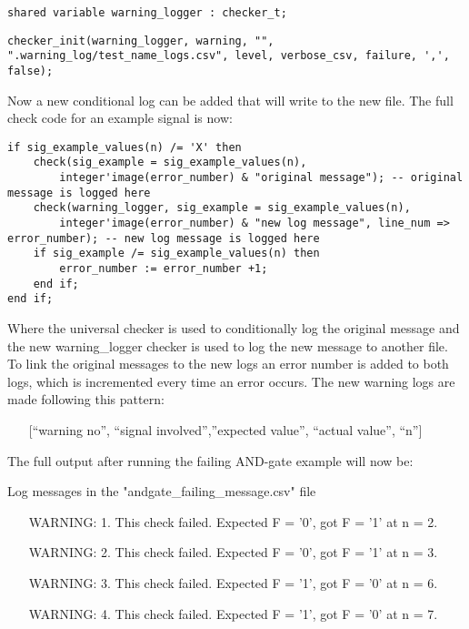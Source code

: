 \begin{lstlisting}[style=vhdl, caption={Custom checker declaration}, label={vhdl:new_checker_declaration}]
shared variable warning_logger : checker_t;
\end{lstlisting}\noindent
\begin{lstlisting}[style=vhdl, caption={Custom checker initialisation}, label={vhdl:new_checker_init}]
checker_init(warning_logger, warning, "", ".warning_log/test_name_logs.csv", level, verbose_csv, failure, ',', false);
\end{lstlisting}\noindent
Now a new conditional log can be added that will write to the new file. The full check code for an example signal is now:
\begin{lstlisting}[style=vhdl, caption={Improved signal checking}, label={vhdl:improved_check}]
if sig_example_values(n) /= 'X' then
	check(sig_example = sig_example_values(n), 
		integer'image(error_number) & "original message"); -- original message is logged here
	check(warning_logger, sig_example = sig_example_values(n), 
		integer'image(error_number) & "new log message", line_num => error_number); -- new log message is logged here
	if sig_example /= sig_example_values(n) then
		error_number := error_number +1;
	end if;
end if;
\end{lstlisting}\noindent
Where the universal checker is used to conditionally log the original message and the new warning\_logger checker is used to log the new message to another file. To link the original messages to the new logs an error number is added to both logs, which is incremented every time an error occurs.
\newpage\noindent
The new warning logs are made following this pattern:%
\begin{customenv}
	\begin{itemize}
		\centering
		\item [] [“warning no”, “signal involved”,”expected value”, “actual value”, “n”] 
	\end{itemize}
\end{customenv}\nline
The full output after running the failing AND-gate example will now be:
\begin{customenv}
	\caption{Log messages in the "andgate\_failing\_message.csv" file}
	\begin{itemize}
		\centering
		\item [WARNING: 1.] This check failed. Expected F = '0', got F = '1' at n = 2.
		\item [WARNING: 2.] This check failed. Expected F = '0', got F = '1' at n = 3.
		\item [WARNING: 3.] This check failed. Expected F = '1', got F = '0' at n = 6.
		\item [WARNING: 4.] This check failed. Expected F = '1', got F = '0' at n = 7.
	\end{itemize}
\end{customenv}
